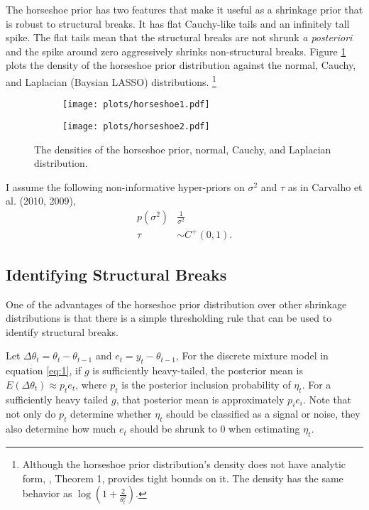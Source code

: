 \documentclass{article}
\begin{document}
The horseshoe prior has two features that make it useful as a shrinkage prior that is robust to structural breaks.
It has flat Cauchy-like tails and an infinitely tall spike.
The flat tails mean that the structural breaks are not shrunk \textit{a posteriori} and the spike around zero aggressively shrinks non-structural breaks.
Figure \ref{fig:horseshoe} plots the density of the horseshoe prior distribution against the normal, Cauchy, and Laplacian (Baysian LASSO) distributions.%
\footnote{
  Although the horseshoe prior distribution's density does not have analytic form, \textcite{CarvalhoPolsonScott2010}, Theorem 1, provides tight bounds on it.
  The density has the same behavior as $\log (1 + \frac{2}{\theta_{t}^{2}})$.
}

\begin{figure}
  \centering
  \begin{subfigure}[b]{0.5\textwidth}
    \texttt{[image: plots/horseshoe1.pdf]}
  \end{subfigure}%
  \begin{subfigure}[b]{0.5\textwidth}
    \texttt{[image: plots/horseshoe2.pdf]}
  \end{subfigure}
  \caption{The densities of the horseshoe prior, normal, Cauchy, and Laplacian distribution.}
  \label{fig:horseshoe}
\end{figure}

I assume the following non-informative hyper-priors on $\sigma^{2}$ and $\tau$ as in Carvalho et al. (2010, 2009),
\begin{align}
  \label{eq:9}
  p(\sigma^{2}) & \frac{1}{\sigma^{2}}  \\
  \label{eq:11}
  \tau &\sim C^{+}(0, 1) \text{.}
\end{align}

\subsection{Identifying Structural Breaks}
\label{sec:ident-struct-breaks}

One of the advantages of the horseshoe prior distribution over other shrinkage distributions is that there is a simple thresholding rule that can be used to identify structural breaks.

Let $\Delta \theta_{t} = \theta_{t} - \theta_{t - 1}$ and $e_{t} = y_{t} - \theta_{t - 1}$, 
For the discrete mixture model in equation \eqref{eq:1}, if $g$ is sufficiently heavy-tailed, the posterior mean is $E(\Delta \theta_{t}) \approx p_{t} e_{t} $, where $p_{t}$ is the posterior inclusion probability of $\eta_{t}$.
For a sufficiently heavy tailed $g$, that posterior mean is approximately $p_{i} e_{i}$.
Note that not only do $p_{t}$ determine whether $\eta_{t}$ should be classified as a signal or noise, they also determine how much $e_{t}$ should be shrunk to 0 when estimating $\eta_{t}$.
\end{document}
